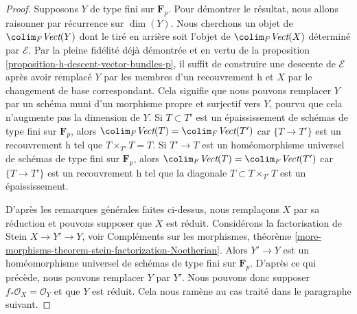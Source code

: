 \begin{proof}
\medskip\noindent
Supposons $Y$ de type fini sur $\mathbf{F}_p$.
Pour démontrer le résultat, nous allons raisonner par récurrence sur $\dim(Y)$.
Nous cherchons un objet de
$\colim_F \textit{Vect}(Y)$ dont le tiré en arrière soit
l'objet de $\colim_F \textit{Vect}(X)$ déterminé par $\mathcal{E}$.
Par la pleine fidélité déjà démontrée et en vertu de la
proposition \ref{proposition-h-descent-vector-bundles-p},
il suffit de construire une descente de $\mathcal{E}$
après avoir remplacé $Y$ par les membres d'un recouvrement h
et $X$ par le changement de base correspondant. Cela signifie
que nous pouvons remplacer $Y$ par un schéma muni d'un morphisme propre et surjectif
vers $Y$, pourvu que cela n'augmente pas la dimension de $Y$.
Si $T \subset T'$ est un épaississement de schémas de type fini
sur $\mathbf{F}_p$, alors
$\colim_F \textit{Vect}(T) = \colim_F \textit{Vect}(T')$
car $\{T \to T'\}$ est un recouvrement h tel que $T \times_{T'} T = T$.
Si $T' \to T$ est un homéomorphisme universel de schémas
de type fini sur $\mathbf{F}_p$, alors
$\colim_F \textit{Vect}(T) = \colim_F \textit{Vect}(T')$
car $\{T \to T'\}$ est un recouvrement h tel que la diagonale
$T \subset T \times_{T'} T$ est un épaississement.

\medskip\noindent
D'après les remarques générales faites ci-dessus, nous remplaçons
$X$ par sa réduction et pouvons supposer que $X$ est réduit.
Considérons la factorisation de Stein $X \to Y' \to Y$, voir
Compléments sur les morphismes, théorème
\ref{more-morphisms-theorem-stein-factorization-Noetherian}.
Alors $Y' \to Y$ est un homéomorphisme universel
de schémas de type fini sur $\mathbf{F}_p$.
D'après ce qui précède, nous pouvons remplacer $Y$ par $Y'$.
Nous pouvons donc supposer $f_*\mathcal{O}_X = \mathcal{O}_Y$
et que $Y$ est réduit. Cela nous ramène au cas traité
dans le paragraphe suivant.


\end{proof}
